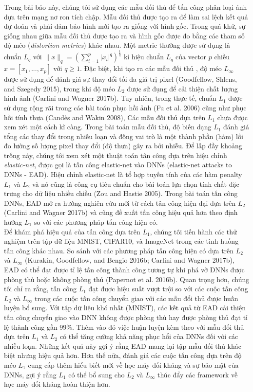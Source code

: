 Trong bài báo này, chúng tôi sử dụng các mẫu đối thủ để tấn công phân loại ảnh dựa trên 
mạng nơ ron tích chập. Mẫu đối thủ được tạo ra để làm sai lệch kết quả dự đoán và phải đảm bảo
hình mới tạo ra giống với hình gốc. Trong quá khứ, sự giống nhau giữa mẫu đối thủ được tạo
ra và hình gốc được đo bằng các tham số độ méo (\textit{distortion metrics}) khác nhau.
Một metric thường được sử dụng là chuẩn $L_q$ 
với $\lVert x \rVert_q = \left( \sum_{i=1}^p |x_i|^q \right)^{\frac{1}{q}}$ kí hiệu chuẩn $L_q$
của vector $p$ chiều $x = [x_1, ..., x_p]$ với $q \geq 1$. Đặc biệt, khi tạo ra các mẫu đối thủ
, độ méo $L_{\infty}$ được sử dụng để đánh giá sự thay đổi tối đa giá trị pixel (Goodfellow, 
Shlens, and Szegedy 2015), trong khi độ méo $L_2$ được sử đụng để cải thiện chất lượng hình 
ảnh (Carlini and Wagner 2017b). Tuy nhiên, trong thực tế, chuẩn $L_1$ được sử dụng rộng rãi 
trong các bài toán phục hồi ảnh (Fu et al. 2006) cũng như phục hồi tính thưa (Candès and Wakin 2008),
Các mẫu đối thủ dựa trên $L_1$ chưa được xem xét một cách kĩ càng. Trong bài toán mẫu đối thủ,
độ biến dạng $L_1$ đánh giá tổng các thay đổi trong nhiễu loạn và đống vai trò là một thành phần
(hàm) lồi đo lường số lượng pixel thay đổi (độ thưa) gây ra bởi nhiễu. Để lấp đầy khoảng trống
này, chúng tôi xem xét một thuật toán tân công dựa trên hiệu chỉnh \textit{elastic-net}, được 
gọi là tấn công elastic-net vào DNNs (elastic-net attacks to DNNs - EAD). Hiệu chỉnh 
elastic-net là tổ hợp tuyến tính của các hàm penalty $L_1$ và $L_2$ và nó cũng là công cụ 
tiêu chuẩn cho bài toán lựa chọn tính chất đặc trưng cho dữ liệu nhiều chiều (Zou and Hastie 2005). 
Trong bài toán tấn công DNNs, EAD mở ra hướng nghiên cứu mới từ cách tân công hiện đại dựa trên 
$L_2$ (Carlini and Wagner 2017b) và cũng đề xuất tấn công hiệu quả hơn theo định hướng $L_1$
so với các phương pháp tấn công hiện có. \\

Để khám phá hiệu quả của tấn công dựa trên $L_1$, chúng tôi tiến hành các thử nghiệm trên tập 
dữ liệu MNIST, CIFAR10, và ImageNet trong các tình huống tấn công khác nhau. So sánh với các 
phương pháp tấn công hiện có dựa trên $L_2$ và $L_{\infty}$ (Kurakin, Goodfellow, and 
Bengio 2016b; Carlini and Wagner 2017b), EAD có thể đạt được tỉ lệ tấn công thành công tương 
tự khi phá vỡ DNNs được phòng thủ hoặc không phòng thủ (Papernot et al. 2016b). Quan trọng 
hơn, chúng tôi chỉ ra rằng, tấn công $L_1$ đạt được hiệu suất vượt trội so với các cuộc tấn
công $L_2$ và $L_{\infty}$ trong các cuộc tấn công chuyển giao với các mẫu đổi thủ được huấn
luyện bổ sung. Với tập dữ liệu khó nhất (MNIST), các kết quả từ EAD cải thiện tấn công chuyển 
giao vào DNN không được phòng thủ hay được phòng thủ đạt tỉ lệ thành công gần $99\%$. Thêm vào 
đó việc huận luyện kèm theo với mẫu đối thủ dựa trên $L_1$ và $L_2$ có thể tăng cường khả 
năng phục hổi của DNNs đối với các nhiễu loạn. Những kết quả này gợi ý rằng EAD mang lại tập 
mẫu đối thủ khác biệt nhưng hiệu quả hơn. Hơn thế nữa, đánh giá các cuộc tấn công dựa trên 
độ méo $L_1$ cung cấp thêm hiểu biết mới về học máy đối kháng và sự bảo mật của DNNs, gợi 
ý rằng $L_1$ có thể bổ sung cho $L_2$ và $L_{\infty}$ thúc đẩy các framework về học máy đối 
kháng hoàn thiện hơn.
